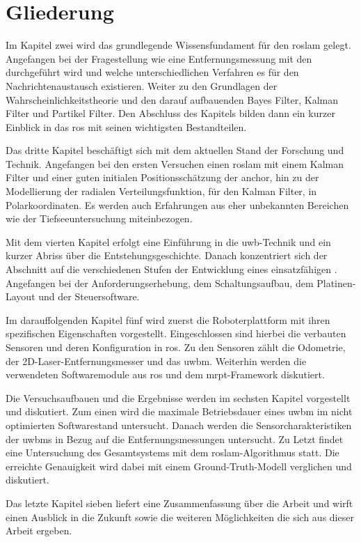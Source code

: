 \section{Gliederung}

Im Kapitel zwei wird das grundlegende Wissensfundament für den \Gls{roslam} gelegt. Angefangen bei der Fragestellung wie eine Entfernungsmessung mit den  durchgeführt wird und welche unterschiedlichen Verfahren es für den Nachrichtenaustausch existieren. Weiter zu den Grundlagen der Wahrscheinlichkeitstheorie und den darauf aufbauenden Bayes Filter, Kalman Filter und Partikel Filter. Den Abschluss des Kapitels bilden dann ein kurzer Einblick in das \Gls{ros} mit seinen wichtigsten Bestandteilen.

Das dritte Kapitel beschäftigt sich mit dem aktuellen Stand der Forschung und Technik. Angefangen bei den ersten Versuchen einen \Gls{roslam} mit einem Kalman Filter und einer guten initialen Positionsschätzung der \Gls{anchor}, hin zu der Modellierung der radialen Verteilungsfunktion, für den Kalman Filter, in Polarkoordinaten. Es werden auch Erfahrungen aus eher unbekannten Bereichen wie der Tiefseeuntersuchung miteinbezogen.

Mit dem vierten Kapitel erfolgt eine Einführung in die \Gls{uwb}-Technik und ein kurzer Abriss über die Entstehungsgeschichte. Danach konzentriert sich der Abschnitt auf die verschiedenen Stufen der Entwicklung eines einsatzfähigen . Angefangen bei der Anforderungserhebung, dem Schaltungsaufbau, dem Platinen-Layout und der Steuersoftware.

Im darauffolgenden Kapitel fünf wird zuerst die Roboterplattform mit ihren spezifischen Eigenschaften vorgestellt. Eingeschlossen sind hierbei die verbauten Sensoren und deren \mbox{Konfiguration} in \Gls{ros}. Zu den Sensoren zählt die Odometrie, der 2D-Laser-Entfernungsmesser und das \Gls{uwbm}. Weiterhin werden die verwendeten Softwaremodule aus \Gls{ros} und dem \Gls{mrpt}-Framework diskutiert.

Die Versuchsaufbauen und die Ergebnisse werden im sechsten Kapitel vorgestellt und diskutiert. Zum einen wird die maximale Betriebsdauer eines \Gls{uwbm} im nicht optimierten Softwarestand untersucht. Danach werden die Sensorcharakteristiken der \Glspl{uwbm} in Bezug auf die Entfernungsmessungen untersucht. Zu Letzt findet eine Untersuchung des Gesamtsystems mit dem \Gls{roslam}-Algorithmus statt. Die erreichte Genauigkeit wird dabei mit einem Ground-Truth-Modell verglichen und diskutiert.

Das letzte Kapitel sieben liefert eine Zusammenfassung über die Arbeit und wirft einen Ausblick in die Zukunft sowie die weiteren Möglichkeiten die sich aus dieser Arbeit ergeben.

